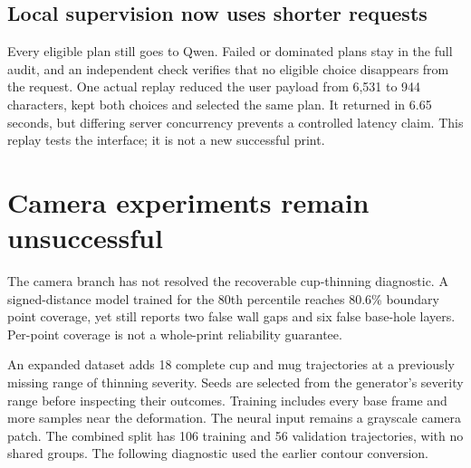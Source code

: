 \documentclass[10pt,letterpaper]{article}
\begin{document}
\subsection*{Local supervision now uses shorter requests}
Every eligible plan still goes to Qwen. Failed or dominated plans stay in the
full audit, and an independent check verifies that no eligible choice disappears
from the request. One actual replay reduced the user payload from 6,531 to 944
characters, kept both choices and selected the same plan. It returned in 6.65
seconds, but differing server concurrency prevents a controlled latency claim.
This replay tests the interface; it is not a new successful print.

\clearpage
\section{Camera experiments remain unsuccessful}

The camera branch has not resolved the recoverable cup-thinning diagnostic.
A signed-distance model trained for the 80th percentile reaches 80.6\% boundary
point coverage, yet still reports two false wall gaps and six false base-hole
layers. Per-point coverage is not a whole-print reliability guarantee.

An expanded dataset adds 18 complete cup and mug trajectories at a previously
missing range of thinning severity. Seeds are selected from the generator's
severity range before inspecting their outcomes. Training includes every base
frame and more samples near the deformation. The neural input remains a grayscale
camera patch. The combined split has 106 training and 56 validation trajectories,
with no shared groups. The following diagnostic used the earlier contour conversion.
\end{document}
